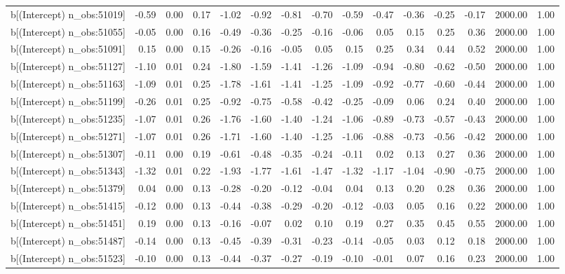 \begin{table}[ht]
\begin{tabular}{rrrrrrrrrrrrrrr}
  b[(Intercept) n\_obs:51019] & -0.59 & 0.00 & 0.17 & -1.02 & -0.92 & -0.81 & -0.70 & -0.59 & -0.47 & -0.36 & -0.25 & -0.17 & 2000.00 & 1.00 \\ 
  b[(Intercept) n\_obs:51055] & -0.05 & 0.00 & 0.16 & -0.49 & -0.36 & -0.25 & -0.16 & -0.06 & 0.05 & 0.15 & 0.25 & 0.36 & 2000.00 & 1.00 \\ 
  b[(Intercept) n\_obs:51091] & 0.15 & 0.00 & 0.15 & -0.26 & -0.16 & -0.05 & 0.05 & 0.15 & 0.25 & 0.34 & 0.44 & 0.52 & 2000.00 & 1.00 \\ 
  b[(Intercept) n\_obs:51127] & -1.10 & 0.01 & 0.24 & -1.80 & -1.59 & -1.41 & -1.26 & -1.09 & -0.94 & -0.80 & -0.62 & -0.50 & 2000.00 & 1.00 \\ 
  b[(Intercept) n\_obs:51163] & -1.09 & 0.01 & 0.25 & -1.78 & -1.61 & -1.41 & -1.25 & -1.09 & -0.92 & -0.77 & -0.60 & -0.44 & 2000.00 & 1.00 \\ 
  b[(Intercept) n\_obs:51199] & -0.26 & 0.01 & 0.25 & -0.92 & -0.75 & -0.58 & -0.42 & -0.25 & -0.09 & 0.06 & 0.24 & 0.40 & 2000.00 & 1.00 \\ 
  b[(Intercept) n\_obs:51235] & -1.07 & 0.01 & 0.26 & -1.76 & -1.60 & -1.40 & -1.24 & -1.06 & -0.89 & -0.73 & -0.57 & -0.43 & 2000.00 & 1.00 \\ 
  b[(Intercept) n\_obs:51271] & -1.07 & 0.01 & 0.26 & -1.71 & -1.60 & -1.40 & -1.25 & -1.06 & -0.88 & -0.73 & -0.56 & -0.42 & 2000.00 & 1.00 \\ 
  b[(Intercept) n\_obs:51307] & -0.11 & 0.00 & 0.19 & -0.61 & -0.48 & -0.35 & -0.24 & -0.11 & 0.02 & 0.13 & 0.27 & 0.36 & 2000.00 & 1.00 \\ 
  b[(Intercept) n\_obs:51343] & -1.32 & 0.01 & 0.22 & -1.93 & -1.77 & -1.61 & -1.47 & -1.32 & -1.17 & -1.04 & -0.90 & -0.75 & 2000.00 & 1.00 \\ 
  b[(Intercept) n\_obs:51379] & 0.04 & 0.00 & 0.13 & -0.28 & -0.20 & -0.12 & -0.04 & 0.04 & 0.13 & 0.20 & 0.28 & 0.36 & 2000.00 & 1.00 \\ 
  b[(Intercept) n\_obs:51415] & -0.12 & 0.00 & 0.13 & -0.44 & -0.38 & -0.29 & -0.20 & -0.12 & -0.03 & 0.05 & 0.16 & 0.22 & 2000.00 & 1.00 \\ 
  b[(Intercept) n\_obs:51451] & 0.19 & 0.00 & 0.13 & -0.16 & -0.07 & 0.02 & 0.10 & 0.19 & 0.27 & 0.35 & 0.45 & 0.55 & 2000.00 & 1.00 \\ 
  b[(Intercept) n\_obs:51487] & -0.14 & 0.00 & 0.13 & -0.45 & -0.39 & -0.31 & -0.23 & -0.14 & -0.05 & 0.03 & 0.12 & 0.18 & 2000.00 & 1.00 \\ 
  b[(Intercept) n\_obs:51523] & -0.10 & 0.00 & 0.13 & -0.44 & -0.37 & -0.27 & -0.19 & -0.10 & -0.01 & 0.07 & 0.16 & 0.23 & 2000.00 & 1.00 \\ 

\end{tabular}
\end{table}
